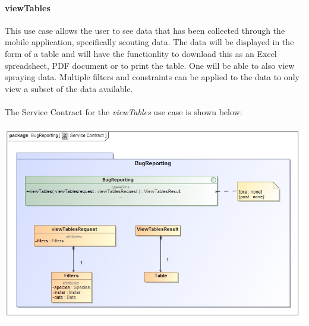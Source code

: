 \documentclass[11pt,a4paper,titlepage]{article}
\begin{document}
		\paragraph{viewTables }
		This use case allows the user to see data that has been collected through the mobile application, specifically scouting data. The data will be displayed in the form of a table and will have the functionlity to download this as an Excel spreadsheet, PDF document or to print the table. One will be able to also view spraying data. Multiple filters and constraints can be applied to the data to only view a subset of the data available.\\\hfill\\
		The Service Contract for the \textit{viewTables} use case is shown below:\\\hfill\\
				\includegraphics[width=\linewidth]{viewTables}	

	
		



%  
\end{document}
